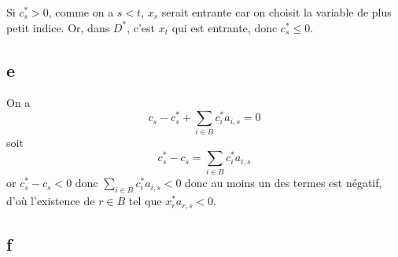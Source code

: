 Si $c^*_s > 0$, comme on a $s<t$, $x_s$ serait entrante car on choisit la variable de plus petit indice. Or, dans $D^*$, c'est $x_t$ qui est entrante, donc $c^*_s \leqslant 0$.

\subsection*{e}

On a 
\[
    c_s - c^*_s + \sum\limits_{i\in B} c_i^*  a_{i,s} =0
\]
soit
\[
    c^*_s - c_s = \sum\limits_{i\in B} c_i^*  a_{i,s}
\]
or $c^*_s - c_s<0$ donc $\sum\limits_{i\in B} c_i^*  a_{i,s} < 0$ donc au moins un des termes est négatif, d'où l'existence de $r\in B$ tel que $x_r^*a_{r,s} < 0$.

\subsection*{f}






